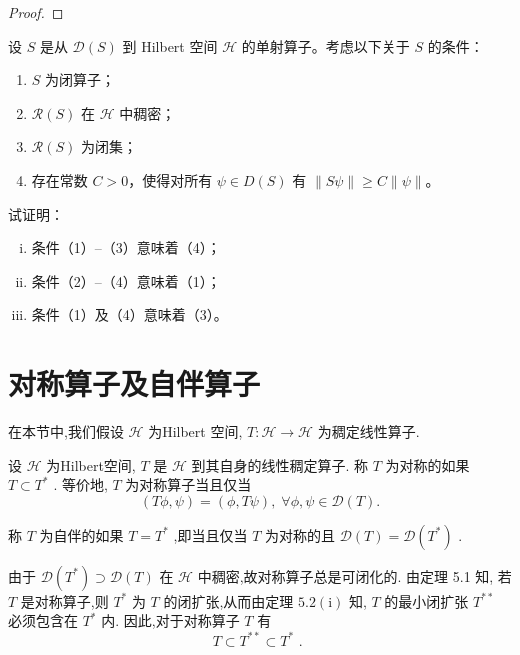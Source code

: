 \documentclass[lang=cn,newtx,10pt,scheme=chinese,thmcnt=chapter]{elegantbook}
\begin{document}
\begin{problemset}
\begin{proof}
\end{proof}
  \item 设 \(S\) 是从 \(\mathcal{D}(S)\) 到 Hilbert 空间 \(\mathcal{H}\) 的单射算子。考虑以下关于 \(S\) 的条件：
  \begin{enumerate}[(1)]
    \item \(S\) 为闭算子；
    \item \(\mathcal{R}(S)\) 在 \(\mathcal{H}\) 中稠密；
    \item \(\mathcal{R}(S)\) 为闭集；
    \item 存在常数 \(C > 0\)，使得对所有 \(\psi \in D(S)\) 有 \(\|S\psi\| \ge C\|\psi\|\)。
  \end{enumerate}
  试证明：
  \begin{enumerate}[(i)]
    \item 条件（1）–（3）意味着（4）；
    \item 条件（2）–（4）意味着（1）；
    \item 条件（1）及（4）意味着（3）。
  \end{enumerate}

\end{problemset}

\section{对称算子及自伴算子}

在本节中,我们假设 \(\mathcal{H}\) 为Hilbert 空间, \(T : \mathcal{H} \rightarrow  \mathcal{H}\) 为稠定线性算子.
\begin{definition}
    设 \(\mathcal{H}\) 为Hilbert空间, \(T\) 是 \(\mathcal{H}\) 到其自身的线性稠定算子. 称 \(T\) 为对称的如果 \(T \subset  {T}^{ * }\) . 等价地, \(T\) 为对称算子当且仅当
\begin{equation*}
\left( {{T\phi },\psi }\right)  = \left( {\phi ,{T\psi }}\right) ,\;\forall \phi ,\psi  \in  \mathcal{D}(T) .
\end{equation*}

称 \(T\) 为自伴的如果 \(T = {T}^{ * }\) ,即当且仅当 \(T\) 为对称的且 \(\mathcal{D}(T)  = \mathcal{D}\left( {T}^{ * }\right)\) .

\end{definition}

由于 \(\mathcal{D}\left( {T}^{ * }\right)  \supset  \mathcal{D}(T)\) 在 \(\mathcal{H}\) 中稠密,故对称算子总是可闭化的. 由定理 5.1 知, 若 \(T\) 是对称算子,则 \({T}^{ * }\) 为 \(T\) 的闭扩张,从而由定理 \({5.2}\left( \mathrm{i}\right)\) 知, \(T\) 的最小闭扩张 \({T}^{* * }\) 必须包含在 \({T}^{ * }\) 内. 因此,对于对称算子 \(T\) 有
\begin{equation*}
T \subset  {T}^{* * } \subset  {T}^{ * }\text{ . }
\end{equation*}
\end{document}
